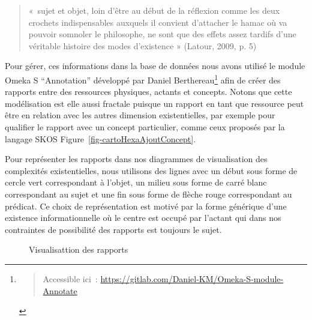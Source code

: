 \documentclass[
  a4paper,
  DIV=11,
  numbers=noendperiod]{scrreprt}
\begin{document}
\begin{quote}
«~sujet et objet, loin d'être au début de la réflexion comme les deux
crochets indispensables auxquels il convient d'attacher le hamac où va
pouvoir somnoler le philosophe, ne sont que des effets assez tardifs
d'une véritable histoire des modes d'existence » (Latour, 2009, p. 5)
\end{quote}

Pour gérer, ces informations dans la base de données nous avons utilisé
le module Omeka S ``Annotation'' développé par Daniel
Berthereau\footnote{\begin{quote}
  Accessible ici~:
  \url{https://gitlab.com/Daniel-KM/Omeka-S-module-Annotate}
  \end{quote}} afin de créer des rapports entre des ressources
physiques, actants et concepts. Notons que cette modélisation est elle
aussi fractale puisque un rapport en tant que ressource peut être en
relation avec les autres dimension existentielles, par exemple pour
qualifier le rapport avec un concept particulier, comme ceux proposés
par la langage SKOS Figure~\ref{fig-cartoHexaAjoutConcept}.

Pour représenter les rapports dans nos diagrammes de visualisation des
complexités existentielles, nous utilisons des lignes avec un début sous
forme de cercle vert correspondant à l'objet, un milieu sous forme de
carré blanc correspondant au sujet et une fin sous forme de flèche rouge
correspondant au prédicat. Ce choix de représentation est motivé par la
forme générique d'une existence informationnelle où le centre est occupé
par l'actant qui dans nos contraintes de possibilité des rapports est
toujours le sujet.

\begin{figure}


\caption{\label{fig-datavizRapport}Visualisattion des rapports}

\end{figure}%
\end{document}
